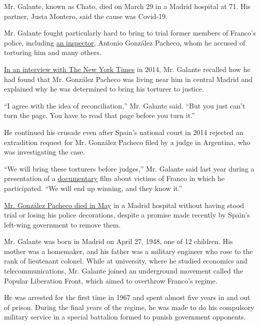 Mr. Galante, known as Chato, died on March 29 in a Madrid hospital at
71. His partner, Justa Montero, said the cause was Covid-19.

Mr. Galante fought particularly hard to bring to trial former members of
Franco's police, including
\href{https://www.nytimes3xbfgragh.onion/2020/05/15/obituaries/antonio-gonzalez-pacheco-accused-policeman-in-francos-spain-dies-at-73.html}{an
inspector}, Antonio González Pacheco, whom he accused of torturing him
and many others.

\href{https://www.nytimes3xbfgragh.onion/2014/04/07/world/europe/facing-his-torturer-as-spain-confronts-its-past.html}{In
an interview with The New York Times} in 2014, Mr. Galante recalled how
he had found that Mr. González Pacheco was living near him in central
Madrid and explained why he was determined to bring his torturer to
justice.

``I agree with the idea of reconciliation,'' Mr. Galante said. ``But you
just can't turn the page. You have to read that page before you turn
it.''

He continued his crusade even after Spain's national court in 2014
rejected an extradition request for Mr. González Pacheco filed by a
judge in Argentina, who was investigating the case.

``We will bring these torturers before judges,'' Mr. Galante said last
year during a presentation of a
\href{https://thesilenceofothers.com/}{documentary} film about victims
of Franco in which he participated. ``We will end up winning, and they
know it.''

\href{https://www.nytimes3xbfgragh.onion/2020/05/15/obituaries/antonio-gonzalez-pacheco-accused-policeman-in-francos-spain-dies-at-73.html}{Mr.
González Pacheco died in May} in a Madrid hospital without having stood
trial or losing his police decorations, despite a promise made recently
by Spain's left-wing government to remove them.

Mr. Galante was born in Madrid on April 27, 1948, one of 12 children.
His mother was a homemaker, and his father was a military engineer who
rose to the rank of lieutenant colonel. While at university, where he
studied economics and telecommunications, Mr. Galante joined an
underground movement called the Popular Liberation Front, which aimed to
overthrow Franco's regime.

He was arrested for the first time in 1967 and spent almost five years
in and out of prison. During the final years of the regime, he was made
to do his compulsory military service in a special battalion formed to
punish government opponents.

